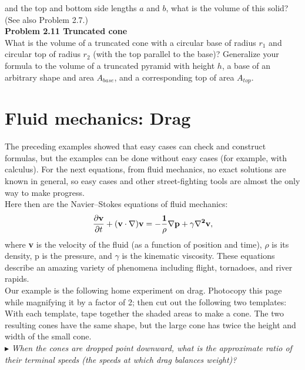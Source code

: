 \documentclass[a4paper]{book}
\begin{document}
\colorbox{light-gray}{
\begin{minipage}{\textwidth}
and the top and bottom side lengths $a$ and $b$, what is the volume of this solid?
(See also Problem 2.7.)\\

{\bf Problem  2.11 Truncated cone}\\
What is the volume of a truncated cone with a circular base of radius $r_1$ and circular top of radius $r_2$ (with the top parallel to the base)?  Generalize your formula to the volume of a truncated pyramid with height $h$, a base of an arbitrary shape and area $A_{base}$, and a corresponding top of area $A_{top}$.
\end{minipage}
} 
\section{Fluid mechanics:  Drag} 
The preceding examples showed that easy cases can check and construct formulas, but the examples can be done without easy cases (for example, with  calculus). For the next equations, from fluid mechanics, no exact solutions are known in general, so easy cases  and other street-fighting tools are almost the only way to make progress.\\

\noindent Here then are the Navier–Stokes equations of fluid mechanics:
\begin{equation}
\frac{\partial{\bf v}}{\partial{t}} + (\bf v \cdot \nabla) \bf v = - \frac{1}{\rho} \nabla p + \gamma \nabla^2 \bf v,
\end{equation}
where {\bf v} is the velocity of the fluid (as a function of position and time), $\rho$ is its density, p is the pressure, and $\gamma$ is the kinematic viscosity.  These equations  describe  an  amazing  variety  of  phenomena  including  flight, tornadoes, and river rapids.\\
Our example is the following home experiment on drag. Photocopy this page while magnifying it by a factor of 2; then cut out the following two templates:
\newpage
\noindent With each template, tape together the shaded areas to make a cone. The two resulting cones have the same shape, but the large cone has twice the height and width of the small cone.\\ 

\noindent $\blacktriangleright$ {\it When the cones are dropped point downward, what is the approximate ratio of their terminal speeds (the speeds at which drag balances weight)?}\\ 
\end{document}
